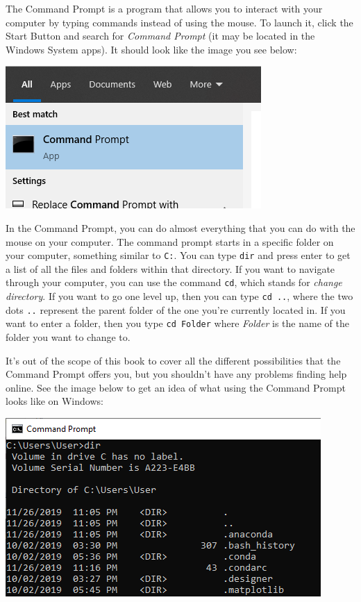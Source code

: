 The Command Prompt is a program that allows you to interact with your computer by typing commands instead of using the mouse. To launch it, click the Start Button and search for \emph{Command Prompt} (it may be located in the Windows System apps). It should look like the image you see below:

\begin{center}
\includegraphics[width=.5\textwidth]{images/Chapter_02/CommandPrompt.png}
\end{center}

In the Command Prompt, you can do almost everything that you can do with the mouse on your computer. The command prompt starts in a specific folder on your computer, something similar to \texttt{C:\Users\User}. You can type \texttt{dir} and press enter to get a list of all the files and folders within that directory. If you want to navigate through your computer, you can use the command \texttt{cd}, which stands for \emph{change directory}. If you want to go one level up, then you can type \texttt{cd ..}, where the two dots \texttt{..} represent the parent folder of the one you're currently located in. If you want to enter a folder, then you type \texttt{cd Folder} where \textit{Folder} is the name of the folder you want to change to.

It's out of the scope of this book to cover all the different possibilities that the Command Prompt offers you, but you shouldn't have any problems finding help online. See the image below to get an idea of what using the Command Prompt looks like on Windows:

\begin{center}
\includegraphics[width=.5\textwidth]{images/Chapter_02/CommandPrompt03.png}
\end{center}


